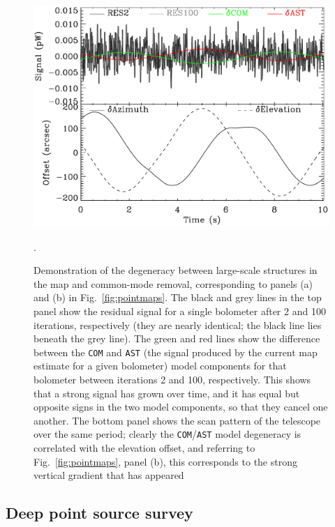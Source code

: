 \documentclass[useAMS,usenatbib,nofootinbib]{mn2e}
\newcommand{\model}[1]{\texttt{#1}}
\begin{document}
\begin{figure}
\centering
\includegraphics[width=\linewidth]{degeneracy}
\caption{Demonstration of the degeneracy between large-scale
  structures in the map and common-mode removal, corresponding to
  panels (a) and (b) in Fig.~\ref{fig:pointmaps}. The black and grey
  lines in the top panel show the residual signal for a single
  bolometer after 2 and 100 iterations, respectively (they are nearly
  identical; the black line lies beneath the grey line). The green and
  red lines show the difference between the \model{COM} and
  \model{AST} (the signal produced by the current map estimate for a
  given bolometer) model components for that bolometer between
  iterations 2 and 100, respectively. This shows that a strong signal
  has grown over time, and it has equal but opposite signs in the two
  model components, so that they cancel one another. The bottom panel
  shows the scan pattern of the telescope over the same period;
  clearly the \model{COM}/\model{AST} model degeneracy is correlated
  with the elevation offset, and referring to
  Fig.~\ref{fig:pointmaps}, panel (b), this corresponds to the strong
  vertical gradient that has appeared}.
\label{fig:degeneracy}
\end{figure}

\subsection{Deep point source survey}
\label{sec:cosmo}
\end{document}
